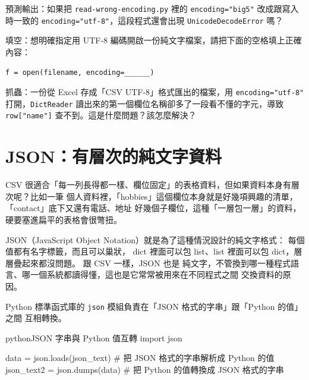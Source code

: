 

\begin{drills}[label=drills:csv-encoding]
\item 預測輸出：如果把 \texttt{read-wrong-encoding.py} 裡的 \texttt{encoding="big5"}
改成跟寫入時一致的 \texttt{encoding="utf-8"}，這段程式還會出現 \texttt{UnicodeDecodeError}
嗎？
\item 填空：想明確指定用 UTF-8 編碼開啟一份純文字檔案，請把下面的空格填上正確內容：
\begin{verbatim}
f = open(filename, encoding=______)
\end{verbatim}
\item 抓蟲：一份從 Excel 存成「CSV UTF-8」格式匯出的檔案，用 \texttt{encoding="utf-8"}
打開，\texttt{DictReader} 讀出來的第一個欄位名稱卻多了一段看不懂的字元，導致
\texttt{row["name"]} 查不到。這是什麼問題？該怎麼解決？
\end{drills}

\section{JSON：有層次的純文字資料}
\label{sec:json-basics}

CSV 很適合「每一列長得都一樣、欄位固定」的表格資料，但如果資料本身有層次呢？比如一筆
個人資料裡，「hobbies」這個欄位本身就是好幾項興趣的清單，「contact」底下又還有電話、地址
好幾個子欄位，這種「一層包一層」的資料，硬要塞進扁平的表格會很彆扭。

JSON（JavaScript
Object Notation）就是為了這種情況設計的純文字格式：
每個值都有名字標籤，而且可以巢狀，
dict 裡面可以包 list、list 裡面可以包 dict，層層疊起來都沒問題。
跟 CSV 一樣，JSON 也是
純文字，不管換到哪一種程式語言、哪一個系統都讀得懂，這也是它常常被用來在不同程式之間
交換資料的原因。

Python 標準函式庫的 \texttt{json} 模組負責在「JSON 格式的字串」跟「Python 的值」之間
互相轉換。

\begin{code}{python}{JSON 字串與 Python 值互轉}
import json

data = json.loads(json_text)      # 把 JSON 格式的字串解析成 Python 的值
json_text2 = json.dumps(data)     # 把 Python 的值轉換成 JSON 格式的字串
\end{code}

